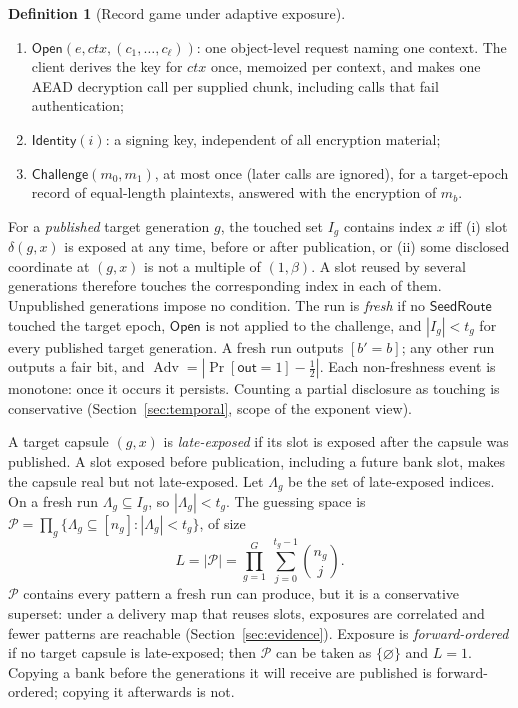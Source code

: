 \documentclass[pdflatex,sn-mathphys-num]{sn-jnl}
\theoremstyle{plain}
\theoremstyle{definition}
\newtheorem{definition}[theorem]{Definition}
\newcommand{\Adv}{\operatorname{Adv}}
\begin{document}
\begin{definition}[Record game under adaptive exposure]
\begin{enumerate}
\item $\mathsf{Open}(e,\mathit{ctx},(c_1,\dots,c_\ell))$: one object-level request naming one context. The client derives the key for $\mathit{ctx}$ once, memoized per context, and makes one AEAD decryption call per supplied chunk, including calls that fail authentication;
\item $\mathsf{Identity}(i)$: a signing key, independent of all encryption material;
\item $\mathsf{Challenge}(m_0,m_1)$, at most once (later calls are ignored), for a target-epoch record of equal-length plaintexts, answered with the encryption of $m_b$.
\end{enumerate}
For a \emph{published} target generation $g$, the touched set $I_g$ contains index $x$ iff (i) slot $\delta(g,x)$ is exposed at any time, before or after publication, or (ii) some disclosed coordinate at $(g,x)$ is not a multiple of $(1,\beta)$. A slot reused by several generations therefore touches the corresponding index in each of them. Unpublished generations impose no condition. The run is \emph{fresh} if no $\mathsf{SeedRoute}$ touched the target epoch, $\mathsf{Open}$ is not applied to the challenge, and $|I_g|<t_g$ for every published target generation. A fresh run outputs $[b'=b]$; any other run outputs a fair bit, and $\Adv=|\Pr[\mathsf{out}=1]-\tfrac12|$. Each non-freshness event is monotone: once it occurs it persists. Counting a partial disclosure as touching is conservative (Section~\ref{sec:temporal}, scope of the exponent view).
\end{definition}

A target capsule $(g,x)$ is \emph{late-exposed} if its slot is exposed after the capsule was published. A slot exposed before publication, including a future bank slot, makes the capsule real but not late-exposed. Let $\Lambda_g$ be the set of late-exposed indices. On a fresh run $\Lambda_g\subseteq I_g$, so $|\Lambda_g|<t_g$. The guessing space is $\mathcal P=\prod_g\{\Lambda_g\subseteq[n_g]:|\Lambda_g|<t_g\}$, of size
\begin{equation}\label{eq:L}
 L=|\mathcal P|=\prod_{g=1}^{G}\ \sum_{j=0}^{t_g-1}\binom{n_g}{j}.
\end{equation}
$\mathcal P$ contains every pattern a fresh run can produce, but it is a conservative superset: under a delivery map that reuses slots, exposures are correlated and fewer patterns are reachable (Section~\ref{sec:evidence}). Exposure is \emph{forward-ordered} if no target capsule is late-exposed; then $\mathcal P$ can be taken as $\{\varnothing\}$ and $L=1$. Copying a bank before the generations it will receive are published is forward-ordered; copying it afterwards is not.
\end{document}
